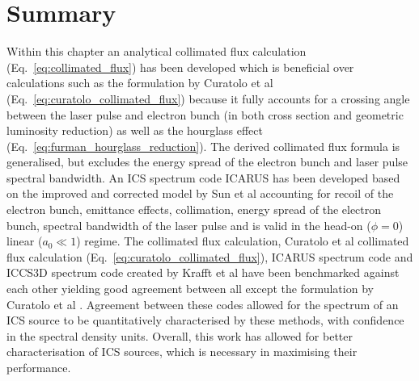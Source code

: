 \documentclass[../main.tex]{subfiles}
\begin{document}
\section{Summary}

Within this chapter an analytical collimated flux calculation (Eq.~\ref{eq:collimated_flux}) has been developed which is beneficial over calculations such as the formulation by Curatolo et al (Eq.~\ref{eq:curatolo_collimated_flux}) \cite{curatolo2017analytical} because it fully accounts for a crossing angle between the laser pulse and electron bunch (in both cross section and geometric luminosity reduction) as well as the hourglass effect (Eq.~\ref{eq:furman_hourglass_reduction}). The derived collimated flux formula is generalised, but excludes the energy spread of the electron bunch and laser pulse spectral bandwidth. An ICS spectrum code \textsc{ICARUS} has been developed based on the improved and corrected model by Sun et al \cite{sun2009characterizations,sun2011theoretical} accounting for recoil of the electron bunch, emittance effects, collimation, energy spread of the electron bunch, spectral bandwidth of the laser pulse and is valid in the head-on ($\phi=0$) linear ($a_{0} \ll 1$) regime. The collimated flux calculation, Curatolo et al collimated flux calculation (Eq.~\ref{eq:curatolo_collimated_flux}), \textsc{ICARUS} spectrum code and \textsc{ICCS3D} spectrum code created by Krafft et al \cite{krafft2016laser,ranjan2018simulation} have been benchmarked against each other yielding good agreement between all except the formulation by Curatolo et al \cite{curatolo2017analytical}. Agreement between these codes allowed for the spectrum of an ICS source to be quantitatively characterised by these methods, with confidence in the spectral density units. Overall, this work has allowed for better characterisation of ICS sources, which is necessary in maximising their performance.
\end{document}
